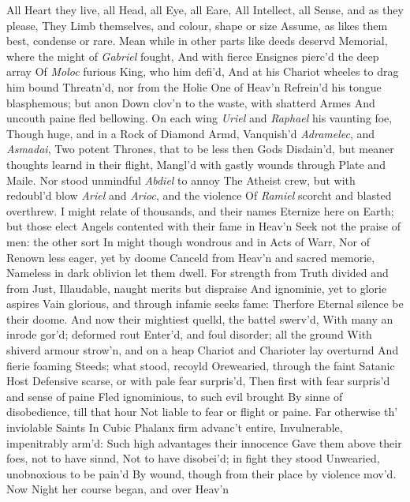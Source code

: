 \documentclass[11pt]{book}
\newcounter {first}
\newcounter {last}
\begin{document}
All Heart they live, all Head, all Eye, all Eare, 
All Intellect, all Sense, and as they please, 
They Limb themselves, and colour, shape or size 
Assume, as likes them best, condense or rare. 
\quad Mean while in other parts like deeds deservd 
Memorial, where the might of \textit{Gabriel} fought, 
And with fierce Ensignes pierc'd the deep array 
Of \textit{Moloc} furious King, who him defi'd, 
And at his Chariot wheeles to drag him bound 
Threatn'd, nor from the Holie One of Heav'n 
Refrein'd his tongue blasphemous; but anon 
Down clov'n to the waste, with shatterd Armes 
And uncouth paine fled bellowing.  On each wing 
\textit{Uriel} and \textit{Raphael} his vaunting foe, 
Though huge, and in a Rock of Diamond Armd, 
Vanquish'd \textit{Adramelec}, and \textit{Asmadai}, 
Two potent Thrones, that to be less then Gods 
Disdain'd, but meaner thoughts learnd in their flight, 
Mangl'd with gastly wounds through Plate and Maile. 
Nor stood unmindful \textit{Abdiel} to annoy 
The Atheist crew, but with redoubl'd blow 
\textit{Ariel} and \textit{Arioc}, and the violence 
Of \textit{Ramiel} scorcht and blasted overthrew. 
I might relate of thousands, and their names 
Eternize here on Earth; but those elect 
Angels contented with their fame in Heav'n 
Seek not the praise of men: the other sort 
In might though wondrous and in Acts of Warr, 
Nor of Renown less eager, yet by doome 
Canceld from Heav'n and sacred memorie, 
Nameless in dark oblivion let them dwell. 
For strength from Truth divided and from Just, 
Illaudable, naught merits but dispraise 
And ignominie, yet to glorie aspires 
Vain glorious, and through infamie seeks fame: 
Therfore Eternal silence be their doome. 
\quad And now their mightiest quelld, the battel swerv'd, 
With many an inrode gor'd; deformed rout 
Enter'd, and foul disorder; all the ground 
With shiverd armour strow'n, and on a heap 
Chariot and Charioter lay overturnd 
And fierie foaming Steeds; what stood, recoyld 
Orewearied, through the faint Satanic Host 
Defensive scarse, or with pale fear surpris'd, 
Then first with fear surpris'd and sense of paine 
Fled ignominious, to such evil brought 
By sinne of disobedience, till that hour 
Not liable to fear or flight or paine. 
Far otherwise th' inviolable Saints 
In Cubic Phalanx firm advanc't entire, 
Invulnerable, impenitrably arm'd: 
Such high advantages their innocence 
Gave them above their foes, not to have sinnd, 
Not to have disobei'd; in fight they stood 
Unwearied, unobnoxious to be pain'd 
By wound, though from their place by violence mov'd. 
\quad Now Night her course began, and over Heav'n 
\end{document}
